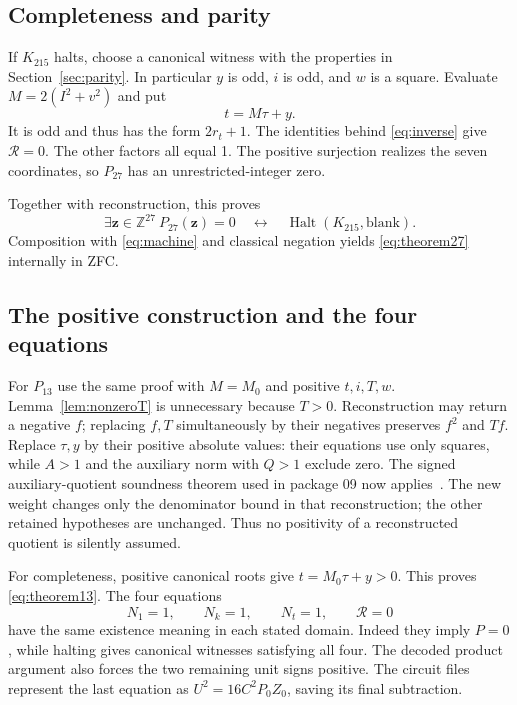 \documentclass[11pt]{article}
\theoremstyle{definition}\newtheorem{definition}[theorem]{Definition}
\theoremstyle{remark}\newtheorem{remark}[theorem]{Remark}
\newcommand{\Z}{\mathbb Z}\newcommand{\N}{\mathbb N}
\newcommand{\Res}{\mathcal R}\newcommand{\pc}{\operatorname{pc}}
\begin{document}
\subsection{Completeness and parity}
If $K_{215}$ halts, choose a canonical witness with the properties in Section~\ref{sec:parity}. In particular $y$ is odd, $i$ is odd, and $w$ is a square. Evaluate $M=2(I^2+v^2)$ and put
\[
t=M\tau+y.
\]
It is odd and thus has the form $2r_t+1$. The identities behind \eqref{eq:inverse} give $\Res=0$. The other factors all equal 1. The positive surjection realizes the seven coordinates, so $P_{27}$ has an unrestricted-integer zero.

Together with reconstruction, this proves
\[
\exists\mathbf z\in\Z^{27}\ P_{27}(\mathbf z)=0
\quad\longleftrightarrow\quad\operatorname{Halt}(K_{215},\mathrm{blank}).
\]
Composition with \eqref{eq:machine} and classical negation yields \eqref{eq:theorem27} internally in ZFC.

\subsection{The positive construction and the four equations}
For $P_{13}$ use the same proof with $M=M_0$ and positive $t,i,T,w$. Lemma~\ref{lem:nonzeroT} is unnecessary because $T>0$. Reconstruction may return a negative $f$; replacing $f,T$ simultaneously by their negatives preserves $f^2$ and $Tf$. Replace $\tau,y$ by their positive absolute values: their equations use only squares, while $A>1$ and the auxiliary norm with $Q>1$ exclude zero. The signed auxiliary-quotient soundness theorem used in package 09 now applies~\cite{amalgamation,signedquotient}. The new weight changes only the denominator bound in that reconstruction; the other retained hypotheses are unchanged. Thus no positivity of a reconstructed quotient is silently assumed.

For completeness, positive canonical roots give $t=M_0\tau+y>0$. This proves \eqref{eq:theorem13}. The four equations
\begin{equation}
\boxed{N_1=1,\qquad N_k=1,\qquad N_t=1,\qquad\Res=0}\label{eq:system}
\end{equation}
have the same existence meaning in each stated domain. Indeed they imply $P=0$, while halting gives canonical witnesses satisfying all four. The decoded product argument also forces the two remaining unit signs positive. The circuit files represent the last equation as $U^2=16C^2P_0Z_0$, saving its final subtraction.
\end{document}
